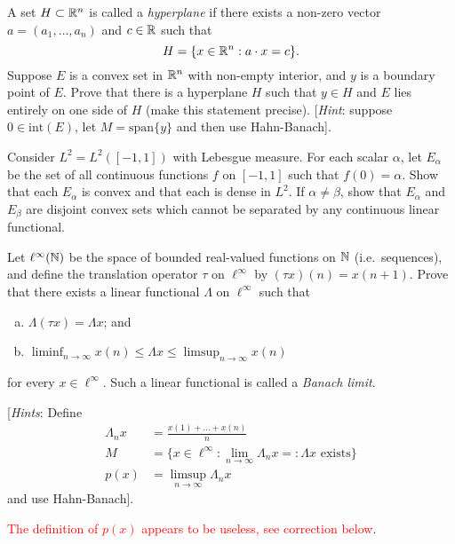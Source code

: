 \begin{exercise}
	A set $H \subset \mathbb{R}^n$ is called a \emph{hyperplane} if there exists a non-zero vector $a = (a_1, \ldots, a_n)$ and $c \in \mathbb{R}$ such that
	\begin{equation*}
		H = \{ x \in \mathbb{R}^n : a \cdot x = c\}.
	\end{equation*}
	Suppose $E$ is a convex set in $\mathbb{R}^n$ with non-empty interior, and $y$ is a boundary point of $E$. Prove that there is a hyperplane $H$ such that $y\in H$ and $E$ lies entirely on one side of $H$ (make this statement precise). [\emph{Hint}: suppose $0 \in \text{int}(E)$, let $M = \text{span}\{y\}$ and then use Hahn-Banach].
\end{exercise}

\begin{exercise}
	Consider $L^2 = L^2([-1,1])$ with Lebesgue measure. For each scalar $\alpha$, let $E_\alpha$ be the set of all continuous functions $f$ on $[-1,1]$ such that $f(0) = \alpha$. Show that each $E_\alpha$ is convex and that each is dense in $L^2$. If $\alpha \ne \beta$, show that $E_\alpha$ and $E_\beta$ are disjoint convex sets which cannot be separated by any continuous linear functional.
\end{exercise}

\begin{exercise}[Ex.\ 4]
	Let $\ell^\infty(\mathbb{N})$ be the space of bounded real-valued functions on $\mathbb{N}$ (i.e.\ sequences), and define the translation operator $\tau$ on $\ell^\infty$ by $(\tau x)(n) = x(n+1)$. Prove that there exists a linear functional $\Lambda$ on $\ell^\infty$ such that
	\begin{enumerate}[(a)]
		\item $\Lambda (\tau x) = \Lambda x$; and
		\item $\displaystyle\liminf_{n\to\infty} x(n) \le \Lambda x \le \displaystyle\limsup_{n\to\infty} x(n)$
	\end{enumerate}
	for every $x \in \ell^\infty$. Such a linear functional is called a \emph{Banach limit}.
	
	[\emph{Hints}: Define
	\begin{align*}
		\Lambda_n x &= \frac{x(1)+\ldots+x(n)}{n} \\
		M &= \{ x \in \ell^\infty : \lim_{n\to\infty} \Lambda_n x =: \Lambda x \text{ exists}\} \\
		p(x) &= \limsup_{n\to\infty} \Lambda_n x
	\end{align*}
	and use Hahn-Banach].
\end{exercise}
\textcolor{red}{The definition of $p(x)$ appears to be useless, see correction below}.

